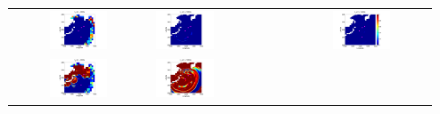 \begin{figure}[ht]
\begin{tabular}{clc}
 \hspace*{-55pt}
\includegraphics[width=0.45\textwidth]{./figures/T12d1.pdf} &
\hspace*{-45pt}
\includegraphics[width=0.45\textwidth]{./figures/T12d3.pdf} &
\hspace*{-45pt}
\includegraphics[width=0.45\textwidth]{./figures/T12d4.pdf} \\
\hspace*{-55pt}
\includegraphics[width=0.45\textwidth]{./figures/T22d1.pdf} &
\hspace*{-45pt}
\includegraphics[width=0.45\textwidth]{./figures/T22d3.pdf} &

\end{tabular}
\end{figure}
